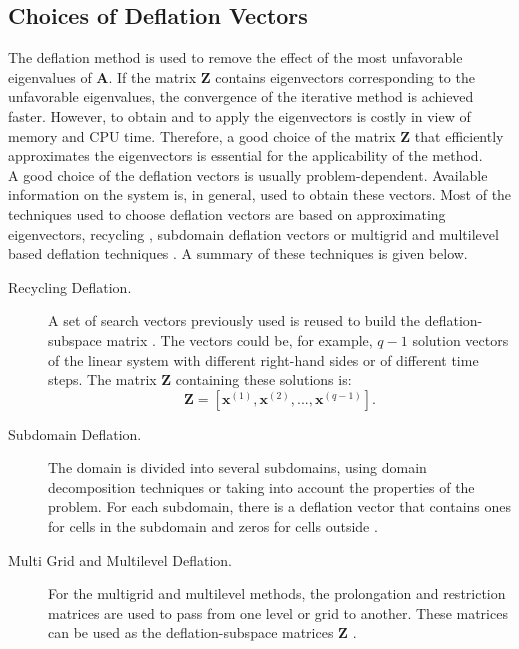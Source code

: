\documentclass[review]{elsarticle}
\begin{document}
\subsection{Choices of Deflation Vectors}
The deflation method is used to remove the effect of the most unfavorable eigenvalues
of $\mathbf{A}$. If the matrix $\mathbf{Z}$ contains eigenvectors corresponding to the unfavorable 
eigenvalues, the convergence of the 
iterative method is achieved faster. However, to obtain and to apply the eigenvectors is costly in view of memory and CPU time.
Therefore, a good choice of the matrix $\mathbf{Z}$ that efficiently approximates the eigenvectors is essential
for the applicability of the method.\\
A good choice of the deflation vectors is usually problem-dependent. Available information on the system is, in general,
used to obtain these vectors.
Most of the techniques used to choose deflation vectors are based on approximating eigenvectors, 
recycling \cite{Clemens04}, subdomain deflation vectors \cite{Vuik02} or multigrid and 
multilevel based deflation techniques \cite{Tang09,Smith96}. A summary of these techniques is given below.
\begin{description}
 \item [Recycling Deflation.] A set of search vectors previously used is reused to build the deflation-subspace 
 matrix \cite{Clemens04}. 
The vectors could be, for example, $q-1$
solution vectors of the linear system with different right-hand sides or of different time steps.
The matrix $\mathbf{Z}$ containing these solutions is:
$$\mathbf{Z}=[\mathbf{x}^{(1)},\mathbf{x}^{(2)},...,\mathbf{x}^{(q-1)}].$$
 \item [Subdomain Deflation.] The domain is divided into several subdomains,
 using domain decomposition techniques or taking into account the properties of the problem.
For each subdomain, there is a deflation vector that contains ones for cells in the 
subdomain and zeros for cells outside \cite{Vuik02}.
 \item [Multi Grid and Multilevel Deflation.] For the multigrid and multilevel methods, 
 the prolongation and restriction matrices are used to pass from one level or grid to another. 
These matrices can be used as the deflation-subspace matrices $\mathbf{Z}$ \cite{Tang09}.
\end{description}
\newpage
\end{document}
